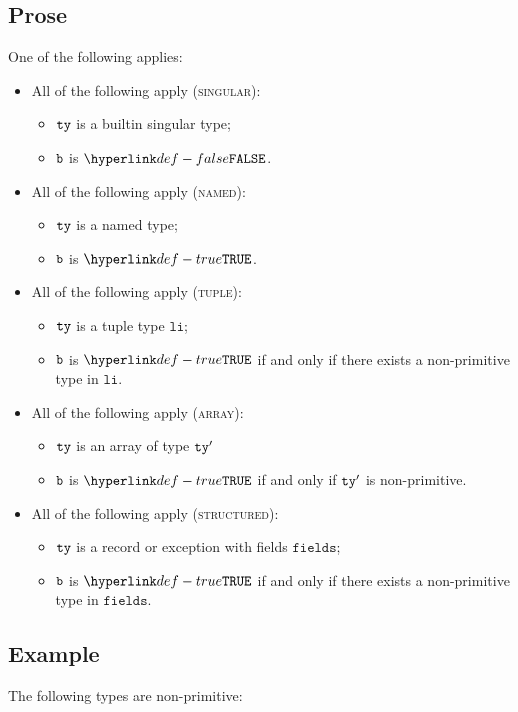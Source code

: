 \documentclass{book}
\newcommand\fields[0]{\texttt{fields}}
\newcommand\vli[0]{\texttt{li}}
\begin{document}
\subsection{Prose}
One of the following applies:
\begin{itemize}
  \item All of the following apply (\textsc{singular}):
  \begin{itemize}
  \item $\texttt{ty}$ is a builtin singular type;
  \item $\texttt{b}$ is $\False$.
  \end{itemize}
  \item All of the following apply (\textsc{named}):
  \begin{itemize}
    \item $\texttt{ty}$ is a named type;
    \item $\texttt{b}$ is $\True$.
  \end{itemize}
  \item All of the following apply (\textsc{tuple}):
  \begin{itemize}
    \item $\texttt{ty}$ is a tuple type $\vli$;
    \item $\texttt{b}$ is $\True$ if and only if there exists a non-primitive type in $\vli$.
  \end{itemize}
  \item All of the following apply (\textsc{array}):
    \begin{itemize}
    \item $\texttt{ty}$ is an array of type $\texttt{ty}'$
    \item $\texttt{b}$ is $\True$ if and only if $\texttt{ty}'$ is non-primitive.
    \end{itemize}
  \item All of the following apply (\textsc{structured}):
    \begin{itemize}
    \item $\texttt{ty}$ is a record or exception with fields $\fields$;
    \item $\texttt{b}$ is $\True$ if and only if there exists a non-primitive type in $\fields$.
    \end{itemize}
\end{itemize}

\subsection{Example}
The following types are non-primitive:
\end{document}
